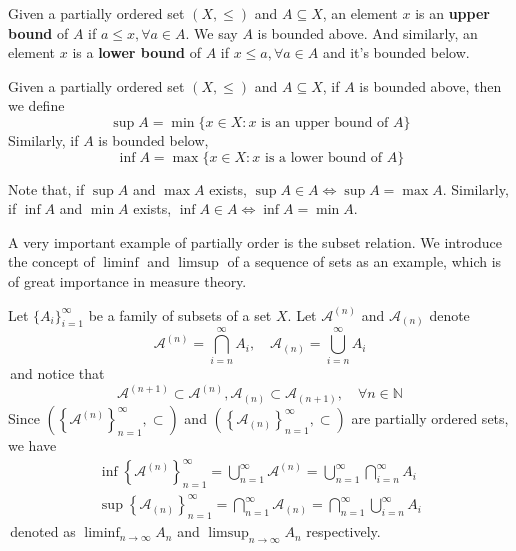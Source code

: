 \begin{definition}[Boundedness]
    Given a partially ordered set $(X,\leq)$ and $A \subseteq X$, an element $x$ is an \textbf{upper bound} of $A$ if $a \leq x, \forall a \in A$. We say $A$ is bounded above. And similarly, an element $x$ is a \textbf{lower bound} of $A$ if $x \leq a, \forall a \in A$ and it's bounded below.
\end{definition}

\begin{definition}
    Given a partially ordered set $(X,\leq)$ and $A \subseteq X$, if $A$ is bounded above, then we define
    $$\sup A = \min\{x \in X : x \text{ is an upper bound of } A\}$$
    Similarly, if $A$ is bounded below, 
    $$\inf A = \max\{x \in X : x \text{ is a lower bound of } A\}$$
\end{definition}
\begin{note}
Note that, if $\sup A$ and $\max A$ exists, $\sup A \in A \iff \sup A = \max A$. Similarly, if $\inf A$ and $\min A$ exists, $\inf A \in A \iff \inf A = \min A$.
\end{note}

A very important example of partially order is the subset relation. We introduce the concept of $\liminf$ and $\limsup$ of a sequence of sets as an example, which is of great importance in measure theory.
\begin{example}
    Let $\{A_i\}_{i=1}^{\infty}$ be a family of subsets of a set $X$. Let $\mathcal{A}^{(n)}$ and $\mathcal{A}_{(n)}$ denote
    $$\mathcal{A}^{(n)} = \bigcap_{i=n}^{\infty} A_i, \quad \mathcal{A}_{(n)} = \bigcup_{i=n}^{\infty} A_i$$
    \,and notice that
    $$\mathcal{A}^{(n+1)} \subset \mathcal{A}^{(n)}, \mathcal{A}_{(n)} \subset \mathcal{A}_{(n+1)},\quad \forall n \in \mathbb{N}$$
    Since $\left(\left\{\mathcal{A}^{(n)}\right\}_{n=1}^{\infty},\subset \right)$ and $\left(\left\{\mathcal{A}_{(n)}\right\}_{n=1}^{\infty},\subset \right)$ are partially ordered sets, we have
    $$\begin{aligned}
        \inf \left\{\mathcal{A}^{(n)}\right\}_{n=1}^{\infty} = \bigcup_{n=1}^{\infty} \mathcal{A}^{(n)} = \bigcup_{n=1}^{\infty} \bigcap_{i=n}^{\infty} A_i\\
    \sup \left\{\mathcal{A}_{(n)}\right\}_{n=1}^{\infty} = \bigcap_{n=1}^{\infty} \mathcal{A}_{(n)} = \bigcap_{n=1}^{\infty} \bigcup_{i=n}^{\infty} A_i
    \end{aligned}$$
    \,denoted as $\liminf_{n \to \infty} A_n$ and $\limsup_{n \to \infty} A_n$ respectively.
\end{example}

